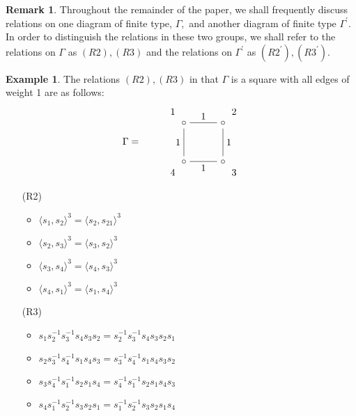 \documentclass[11pt]{amsart}
\theoremstyle{definition}
\newtheorem{ex}[thm]{Example}
\newtheorem{rem}[thm]{Remark}
\begin{document}
\begin{rem}
Throughout the remainder of the paper, we shall frequently discuss relations on one diagram of finite type, $\Gamma,$ and another diagram of finite type $\Gamma^\prime.$ In order to distinguish the relations in these two groups, we shall refer to the relations on $\Gamma$ as $(R2),(R3)$ and the relations on $\Gamma^\prime$ as $(R2^\prime),(R3^\prime).$
\end{rem}



\begin{ex}
The relations $(R2),(R3)$ in that $\Gamma$ is a square with all edges of weight 1 are as follows:
\[\Gamma =\begin{tikzpicture}[baseline=-0.5ex]
 \matrix[matrix of math nodes,column sep={40pt,between origins},row
    sep={40pt,between origins},nodes={asymmetrical rectangle}] at (6,0)
  {
    & |[name = ul]|\circ& |[name = ur]|\circ\\
    &|[name=dl]| \circ &|[name=dr]| \circ \\
  };
\draw
  (ul) -- node[above] {1} (ur)
  ;
  \draw
  (dl) -- node[left]{1}(ul)
  ;
  \draw
  (dr) -- node[below]{1}(dl)
  ;
  \draw
  (ur) -- node[right]{1} (dr)
  ;  
      \node [yshift = .4 cm,xshift = -.4 cm] at (ul){1};
   \node  [yshift = .4 cm,xshift = .4 cm] at (ur){2};
    \node [yshift = -.4 cm,xshift = .4 cm] at (dr){3};
    \node [yshift = -.4 cm,xshift = -.4 cm] at (dl){4};
   \end{tikzpicture}\]
   \begin{enumerate}
	\item[(R2)]
	\begin{itemize}
	\item $\langle s_1,s_2 \rangle^3 = \langle s_2,s_21 \rangle^3$
	\item $\langle s_2,s_3 \rangle^3 = \langle s_3,s_2 \rangle^3$
	\item $\langle s_3,s_4 \rangle^3 = \langle s_4,s_3 \rangle^3$
	\item $\langle s_4,s_1 \rangle^3 = \langle s_1,s_4 \rangle^3$
\end{itemize} 
	\item[(R3)]
	\begin{itemize}
	\item $s_{1}s_{2}^{-1}s_{3}^{-1}s_4s_{3}s_2 = s_{2}^{-1}s_{3}^{-1}s_4s_3s_{2}s_{1}$
	\item $s_{2}s_{3}^{-1}s_{4}^{-1}s_1s_{4}s_3 = s_{3}^{-1}s_{4}^{-1}s_1s_4s_{3}s_{2}$
	\item $s_{3}s_{4}^{-1}s_{1}^{-1}s_2s_{1}s_4 = s_{4}^{-1}s_{1}^{-1}s_2s_1s_{4}s_{3}$
	\item $s_{4}s_{1}^{-1}s_{2}^{-1}s_3s_{2}s_1 = s_{1}^{-1}s_{2}^{-1}s_3s_2s_{1}s_{4}$
\end{itemize} 
\end{enumerate}
\end{ex}
\end{document}
